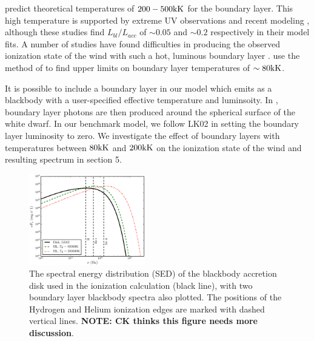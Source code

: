 \documentclass[preprint, a4paper, 11pt]{aastex}
\begin{document}
{\cite{pringlesavonije1979} predict theoretical temperatures of 
$200-500{\rm kK}$ for the boundary layer.
This high temperature is supported by extreme UV observations \citep{mauche2004}
and recent modeling \citep{suleimanov2014}, although these studies 
find $L_{bl}/L_{acc}$ of $\sim0.05$ and $\sim0.2$ respectively in their
model fits. A number of studies have found difficulties
in producing the observed ionization state of the wind
with such a hot, luminous boundary layer 
\citep[see e.g.][]{maucheraymond1987, drewverbunt1985}.
\cite{hoare1991}
use the method of \cite{zanstra1929} to find upper limits on 
boundary layer temperatures of $\sim80{\rm kK}$.

It is possible to include a boundary layer in our model which emits 
as a blackbody with a user-specified effective temperature and luminsoity.
In \py, boundary layer photons are then produced around the spherical surface of the 
white dwarf. In our benchmark model, we follow LK02 in setting the boundary layer
luminosity to zero. We investigate the effect
of boundary layers with temperatures between $80{\rm kK}$ and $200{\rm kK}$ 
on the ionization state of the wind and resulting
spectrum in section 5.


\begin{figure}
\centering
\includegraphics[width=0.45\textwidth]{figures/sed_figure.eps}
\caption{
The spectral energy distribution (SED) of the blackbody accretion
disk used in the ionization calculation (black line), 
with two boundary layer blackbody spectra also plotted.
The positions of the Hydrogen and Helium ionization edges 
are marked with dashed vertical lines.
{\bf NOTE: CK thinks this figure needs more discussion}.
}
\label{sed}
\end{figure}


}
\end{document}
